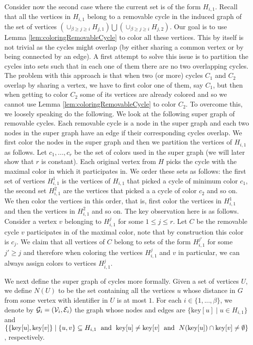 \documentclass{article}
\theoremstyle{definition}
\def\shiri#1{\textcolor{red}{[Shiri: #1]}}
\begin{document}
Consider now the second case where the current set is of the form $H_{i,1}$.
Recall that all the vertices in $H_{i,1}$ belong to a removable cycle in the induced graph of the set of vertices $\left( \cup_{\beta \geq j\geq i}{H_{j,1}}\right) \bigcup \left( \cup_{\beta \geq j \geq i}{H_{j,2}} \right)$.
Our goal is to use Lemma \ref{lem:coloringRemovableCycle} to color all these vertices.
This by itself is not trivial as the cycles might overlap (by either sharing a common vertex or by being connected by an edge).
A first attempt to solve this issue is to partition the cycles into sets such that in each one of them there are no two overlapping cycles.
The problem with this approach is that when two (or more) cycles $C_1$ and $C_2$ overlap by sharing a vertex, we have to first color one of them, say $C_1$, but then when getting to color $C_2$ some of its vertices are already colored and so we cannot use Lemma \ref{lem:coloringRemovableCycle} to color $C_2$.
To overcome this, we loosely speaking do the following.
We look at the following super graph of removable cycles.
Each removable cycle is a node in the super graph and each two nodes in the super graph have an edge if their corresponding cycles overlap.
We first color the nodes in the super graph and then we partition the vertices of $H_{i,1}$ as follows.
Let $c_1,...,c_r$ be the set of colors used in the super graph (we will later show that $r$ is constant).
Each original vertex from $H$ picks the cycle with the maximal color in which it participates in. We order these sets as follows: the first set of vertices $H_{i,1}^1$ is the vertices of $H_{i,1}$ that picked a cycle of minimum color $c_1$, the second set $H_{i,1}^2$ are the vertices that picked a a cycle of color $c_2$ and so on.
We then color the vertices in this order, that is, first color the vertices in $H_{i,1}^1$ and then the vertices in $H_{i,1}^2$ and so on.
The key observation here is as follows.
Consider a vertex $v$ belonging to $H_{i,1}^j$ for some $1 \leq j \leq r$.
Let $C$ be the removable cycle $v$ participates in of the maximal color, note that by construction this color is $c_j$.
We claim that all vertices of $C$ belong to sets of the form $H_{i,1}^{j'}$ for some $j' \geq j$ and therefore when coloring the vertices
$H_{i,1}^j$ and $v$ in particular, we can always assign colors to vertices $H_{i,1}^j$.


We next define the super graph of cycles more formally.
Given a set of vertices $U$, we define $N(U)$ to be the set containing
 all the vertices $u$ whose distance in $G$ from some vertex with identifier in $U$ is at most $1$.
For each $i \in \{1, ..., \beta\}$, we denote by ${\cal G}_{i} = ({\cal V}_{i},{\cal E}_{i})$ the graph whose nodes and edges are $\{\text{key}[u] \mid u \in H_{i,1}\}$ and $\{\{\text{key}[u], \text{key}[v]\}\mid \{u,v\} \subseteq H_{i,1} \text{\; and \;} \text{key}[u] \ne \text{key}[v] \text{\; and \;} N(\text{key}[u]) \cap \text{key}[v] \ne \emptyset  \}$, respectively.
\end{document}
